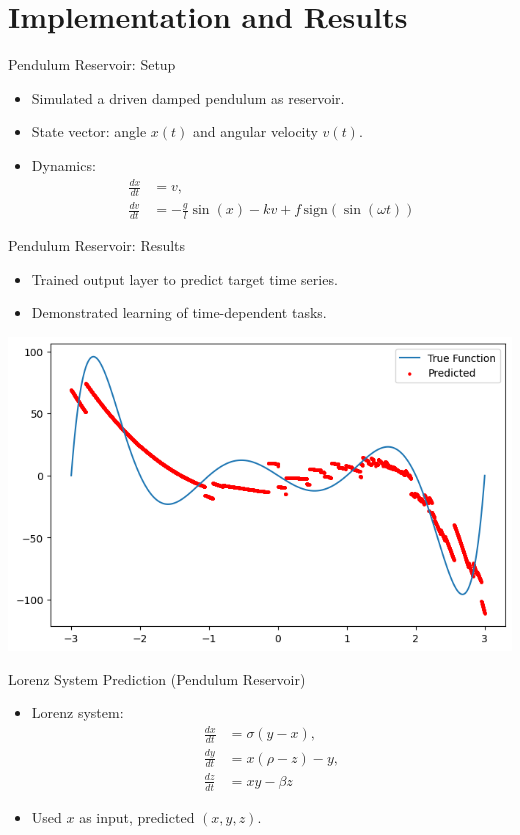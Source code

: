 \documentclass{beamer}
\begin{document}
\section{Implementation and Results}
\begin{frame}{Pendulum Reservoir: Setup}
  \begin{itemize}
    \item Simulated a driven damped pendulum as reservoir.
    \item State vector: angle $x(t)$ and angular velocity $v(t)$.
    \item Dynamics:
      \[
      \begin{aligned}
      \frac{dx}{dt} &= v, \\
      \frac{dv}{dt} &= -\frac{g}{l} \sin(x) - k v + f\, \text{sign}(\sin(\omega t))
      \end{aligned}
      \]
  \end{itemize}
\end{frame}

\begin{frame}{Pendulum Reservoir: Results}
  \begin{itemize}
    \item Trained output layer to predict target time series.
    \item Demonstrated learning of time-dependent tasks.
  \end{itemize}
  \begin{center}
    \includegraphics[width=0.75\linewidth]{figures/pendulum_result_0.png}
  \end{center}
\end{frame}

\begin{frame}{Lorenz System Prediction (Pendulum Reservoir)}
  \begin{itemize}
    \item Lorenz system:
      \[
      \begin{aligned}
      \frac{dx}{dt} &= \sigma (y - x), \\
      \frac{dy}{dt} &= x (\rho - z) - y, \\
      \frac{dz}{dt} &= x y - \beta z
      \end{aligned}
      \]
    \item Used $x$ as input, predicted $(x, y, z)$.
  \end{itemize}
\end{frame}
\end{document}
